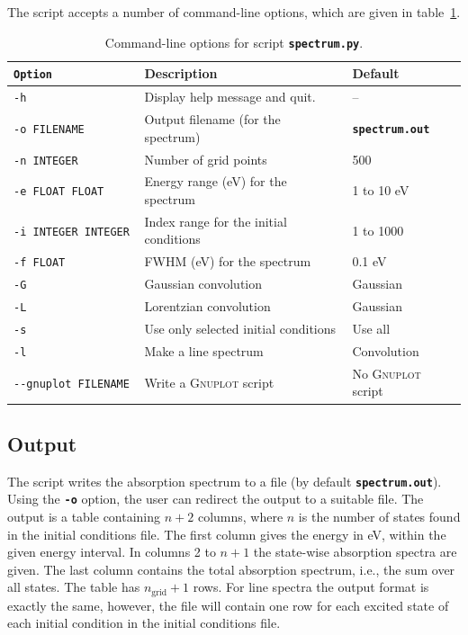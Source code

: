 \documentclass[a4paper,11pt,DIV=15,openany,twoside=false]{scrbook}
\newcommand{\ttt}[1]{\textbf{\texttt{#1}}}
\begin{document}
The script accepts a number of command-line options, which are given in table~\ref{tab:spectrum_opts}.
\begin{table}
  \centering
  \caption{Command-line options for script \ttt{spectrum.py}.}
  \label{tab:spectrum_opts}
  \begin{tabular}{>{\tt}lll}
    \toprule
    \rmfamily Option        &Description      &Default\\
    \midrule
    -h                  &Display help message and quit.         & --        \\
    -o FILENAME         &Output filename (for the spectrum)     &\ttt{spectrum.out}\\
    -n INTEGER          &Number of grid points                  &500       \\
    -e FLOAT FLOAT      &Energy range (eV) for the spectrum     &1 to 10 eV\\
    -i INTEGER INTEGER  &Index range for the initial conditions &1 to 1000\\
    -f FLOAT            &FWHM (eV) for the spectrum             &0.1 eV\\
    -G                  &Gaussian convolution                   &Gaussian\\
    -L                  &Lorentzian convolution                 &Gaussian\\
    -s                  &Use only selected initial conditions   &Use all\\
    -l                  &Make a line spectrum                   &Convolution\\
    -{}-gnuplot FILENAME  &Write a \textsc{Gnuplot} script        &No \textsc{Gnuplot} script\\
    \bottomrule
  \end{tabular}
\end{table}

\subsection{Output}

The script writes the absorption spectrum to a file (by default \ttt{spectrum.out}). Using the \ttt{-o} option, the user can redirect the output to a suitable file. The output is a table containing $n+2$ columns, where $n$ is the number of states found in the initial conditions file. The first column gives the energy in eV, within the given energy interval. In columns 2 to $n+1$ the state-wise absorption spectra are given. The last column contains the total absorption spectrum, i.e., the sum over all states. The table has $n_{\text{grid}}+1$ rows. For line spectra the output format is exactly the same, however, the file will contain one row for each excited state of each initial condition in the initial conditions file.
\end{document}
